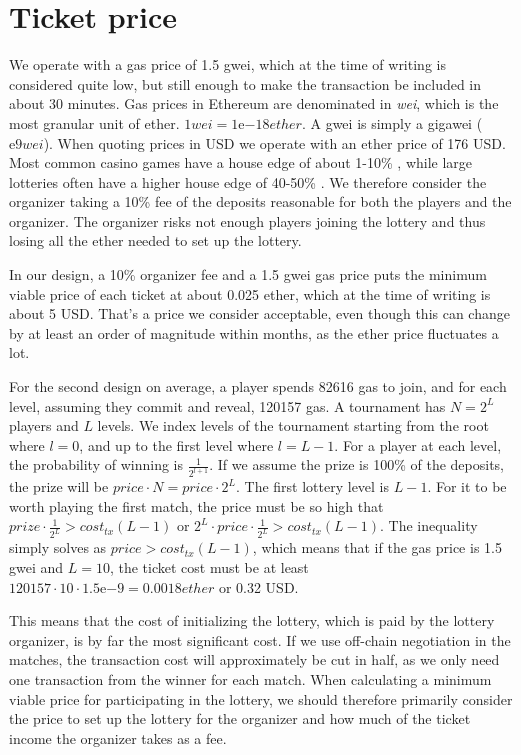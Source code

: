 \section{Ticket price}
\label{sec:ticket-price}

We operate with a gas price of 1.5 gwei, which at the time of writing is considered quite low, but still enough to make the transaction be included in about 30 minutes. Gas prices in Ethereum are denominated in \emph{wei}, which is the most granular unit of ether. $1 wei=1 \mathrm{e}{-18} ether$. A gwei is simply a gigawei ($\mathrm{e}{9} wei$). When quoting prices in USD we operate with an ether price of 176 USD. Most common casino games have a house edge of about 1-10\% \cite{walsh_houses_nodate}, while large lotteries often have a higher house edge of 40-50\% \cite{shackleford_house_nodate}. We therefore consider the organizer taking a 10\% fee of the deposits reasonable for both the players and the organizer. The organizer risks not enough players joining the lottery and thus losing all the ether needed to set up the lottery. 

In our design, a 10\% organizer fee and a 1.5 gwei gas price puts the minimum viable price of each ticket at about 0.025 ether, which at the time of writing is about 5 USD. That's a price we consider acceptable, even though this can change by at least an order of magnitude within months, as the ether price fluctuates a lot. 

For the second design on average, a player spends 82616 gas to join, and for each level, assuming they commit and reveal, 120157 gas. A tournament has $N=2^L$ players and $L$ levels. We index levels of the tournament starting from the root where $l=0$, and up to the first level where $l=L-1$. For a player at each level, the probability of winning is $\frac{1}{2^{l+1}}$. If we assume the prize is 100\% of the deposits, the prize will be $price \cdot N=price \cdot 2^L$. The first lottery level is $L-1$. For it to be worth playing the first match, the price must be so high that $prize \cdot \frac{1}{2^L} > cost_{tx}(L-1)$ or $2^L \cdot price \cdot \frac{1}{2^L} > cost_{tx}(L-1)$. The inequality simply solves as $price > cost_{tx}(L-1)$, which means that if the gas price is 1.5 gwei and $L=10$, the ticket cost must be at least $120157 \cdot 10 \cdot 1.5 \mathrm{e}{-9}=0.0018 ether$ or 0.32 USD. 

This means that the cost of initializing the lottery, which is paid by the lottery organizer, is by far the most significant cost. If we use off-chain negotiation in the matches, the transaction cost will approximately be cut in half, as we only need one transaction from the winner for each match. When calculating a minimum viable price for participating in the lottery, we should therefore primarily consider the price to set up the lottery for the organizer and how much of the ticket income the organizer takes as a fee.
